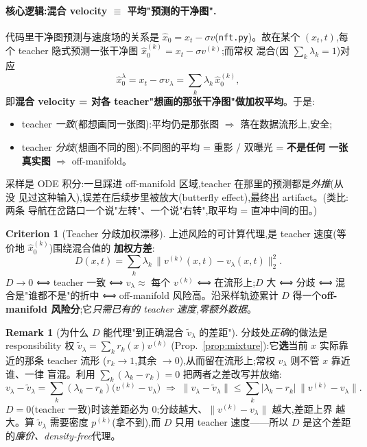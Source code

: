 \documentclass[11pt,a4paper]{article}
\newcommand{\resp}{r}
\theoremstyle{definition}
\newtheorem{remark}{Remark}
\newtheorem{criterion}{Criterion}
\begin{document}
\paragraph{核心逻辑:混合 velocity $\equiv$ 平均"预测的干净图".}
代码里干净图预测与速度场的关系是 $\hat x_0=x_t-\sigma v$(\texttt{nft.py})。故在某个
$(x_t,t)$,每个 teacher 隐式预测一张干净图 $\hat x_0^{(k)}=x_t-\sigma v^{(k)}$;而常权
混合(因 $\sum_k\lambda_k=1$)对应
\begin{equation}
\hat x_0^{\lambda}=x_t-\sigma v_\lambda=\sum_k\lambda_k\,\hat x_0^{(k)},
\label{eq:x0_avg}
\end{equation}
即\textbf{混合 velocity = 对各 teacher"想画的那张干净图"做加权平均}。于是:
\begin{itemize}[leftmargin=1.5em]
\item teacher \emph{一致}(都想画同一张图):平均仍是那张图 $\Rightarrow$ 落在数据流形上,安全;
\item teacher \emph{分歧}(想画不同的图):不同图的平均 = 重影 / 双曝光 = \textbf{不是任何
一张真实图} $\Rightarrow$ off-manifold。
\end{itemize}
采样是 ODE 积分:一旦踩进 off-manifold 区域,teacher 在那里的预测都是\emph{外推}(从没
见过这种输入),误差在后续步里被放大(butterfly effect),最终出 artifact。(类比:两条
导航在岔路口一个说"左转"、一个说"右转",取平均 = 直冲中间的田。)

\begin{criterion}[Teacher 分歧加权漂移]
\label{crit:drift}
上述风险的可计算代理,是 teacher 速度(等价地 $\hat x_0^{(k)}$)围绕混合值的
\textbf{加权方差}:
\begin{equation}
D(x,t)=\sum_k \lambda_k\,\big\|v^{(k)}(x,t)-v_\lambda(x,t)\big\|_2^2.
\end{equation}
$D\to 0$ ⟺ teacher 一致 ⟺ $v_\lambda\approx$ 每个 $v^{(k)}$ ⟺ 在流形上;$D$ 大 ⟺ 分歧 ⟺
混合是"谁都不是"的折中 ⟺ off-manifold 风险高。沿采样轨迹累计 $D$ 得一个\textbf{off-manifold
风险分};它\emph{只需已有的 teacher 速度,零额外数据}。
\end{criterion}

\begin{remark}[为什么 $D$ 能代理"到正确混合 $\tilde v_\lambda$ 的差距"]
\label{rmk:drift_bound}
分歧处\emph{正确}的做法是 responsibility 权 $\tilde v_\lambda=\sum_k\resp_k(x)v^{(k)}$
(Prop.~\ref{prop:mixture}):它\textbf{选}当前 $x$ 实际靠近的那条 teacher 流形
($\resp_k\to1$,其余 $\to0$),从而留在流形上;常权 $v_\lambda$ 则不管 $x$ 靠近谁、一律
盲混。利用 $\sum_k(\lambda_k-\resp_k)=0$ 把两者之差改写并放缩:
\begin{equation}
v_\lambda-\tilde v_\lambda=\sum_k(\lambda_k-\resp_k)\big(v^{(k)}-v_\lambda\big)
\;\Rightarrow\;
\big\|v_\lambda-\tilde v_\lambda\big\|\le\sum_k|\lambda_k-\resp_k|\,\big\|v^{(k)}-v_\lambda\big\|.
\end{equation}
$D=0$(teacher 一致)时该差距必为 $0$;分歧越大、$\|v^{(k)}-v_\lambda\|$ 越大,差距上界
越大。算 $\tilde v_\lambda$ 需要密度 $p^{(k)}$(拿不到),而 $D$ 只用 teacher 速度——所以
$D$ 是这个差距的\emph{廉价、density-free}代理。
\end{remark}
\end{document}
